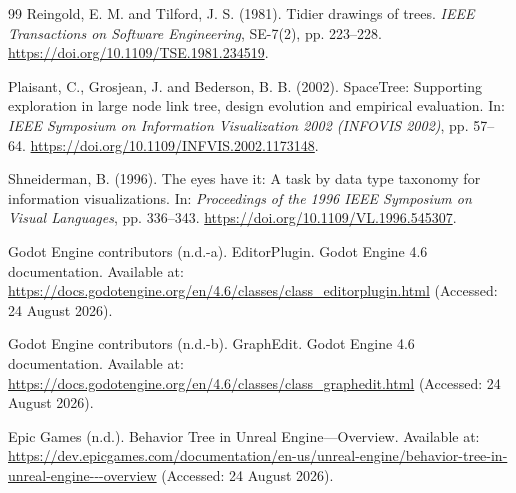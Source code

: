 \begin{thebibliography}{99}
Reingold, E. M. and Tilford, J. S. (1981). Tidier drawings of trees. \emph{IEEE Transactions on Software Engineering}, SE-7(2), pp. 223--228. \url{https://doi.org/10.1109/TSE.1981.234519}.

Plaisant, C., Grosjean, J. and Bederson, B. B. (2002). SpaceTree: Supporting exploration in large node link tree, design evolution and empirical evaluation. In: \emph{IEEE Symposium on Information Visualization 2002 (INFOVIS 2002)}, pp. 57--64. \url{https://doi.org/10.1109/INFVIS.2002.1173148}.

Shneiderman, B. (1996). The eyes have it: A task by data type taxonomy for information visualizations. In: \emph{Proceedings of the 1996 IEEE Symposium on Visual Languages}, pp. 336--343. \url{https://doi.org/10.1109/VL.1996.545307}.

Godot Engine contributors (n.d.-a). EditorPlugin. Godot Engine 4.6 documentation. Available at: \url{https://docs.godotengine.org/en/4.6/classes/class_editorplugin.html} (Accessed: 24 August 2026).

Godot Engine contributors (n.d.-b). GraphEdit. Godot Engine 4.6 documentation. Available at: \url{https://docs.godotengine.org/en/4.6/classes/class_graphedit.html} (Accessed: 24 August 2026).

Epic Games (n.d.). Behavior Tree in Unreal Engine---Overview. Available at: \url{https://dev.epicgames.com/documentation/en-us/unreal-engine/behavior-tree-in-unreal-engine---overview} (Accessed: 24 August 2026).
\end{thebibliography}
